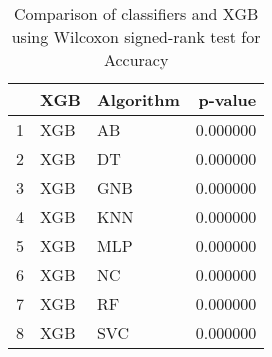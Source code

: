 \begin{table}
\footnotesize
\caption{Comparison of classifiers and XGB using Wilcoxon signed-rank test for Accuracy}
\label{tab:XGB wilcoxon Accuracy comparison}
\begin{tabular}{lllr}
\hline
 & XGB & Algorithm & p-value \\
\hline
1 & XGB & AB & 0.000000 \\
2 & XGB & DT & 0.000000 \\
3 & XGB & GNB & 0.000000 \\
4 & XGB & KNN & 0.000000 \\
5 & XGB & MLP & 0.000000 \\
6 & XGB & NC & 0.000000 \\
7 & XGB & RF & 0.000000 \\
8 & XGB & SVC & 0.000000 \\
\hline
\end{tabular}
\end{table}
